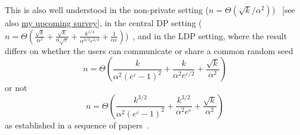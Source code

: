\documentclass[11pt]{article}
\begin{document}
\begin{description}
This is also well understood in the non-private setting ($n=\Theta(\sqrt{k}/\alpha^2)$)~\cite{Paninski08} [see also \href{https://ccanonne.github.io/survey-topics-dt.html}{my upcoming survey}], in the central DP setting ($n=\Theta\!\left( \frac{\sqrt{k}}{\alpha^2} + \frac{\sqrt{k}}{\alpha\sqrt{\varepsilon}}+\frac{k^{1/3}}{\alpha^{4/3}\varepsilon^{2/3}} + \frac{1}{\alpha\varepsilon} \right)$)~\cite{AcharyaSZ18,AliakbarpourDR18}, and in the LDP setting, where the result differs on whether the users can communicate or share a common random seed 
\begin{equation}
	\label{eq:testing:ldp:publiccoin}
	n=\Theta\!\left( \frac{k}{\alpha^2(e^\varepsilon-1)^2} + \frac{k}{\alpha^2e^{\varepsilon/2}} + \frac{\sqrt{k}}{\alpha^2}\right)
\end{equation} or not 
\begin{equation}
	\label{eq:testing:ldp:privatecoin}
	n=\Theta\!\left( \frac{k^{3/2}}{\alpha^2(e^\varepsilon-1)^2} + \frac{k^{3/2}}{\alpha^2e^{\varepsilon}} + \frac{\sqrt{k}}{\alpha^2}\right)
\end{equation}
as established in a sequence of papers~\cite{AcharyaCT21,AminJM20,AcharyaCFST21,AcharyaCLST22,CanonneL22}. %


\end{description}
\end{document}
